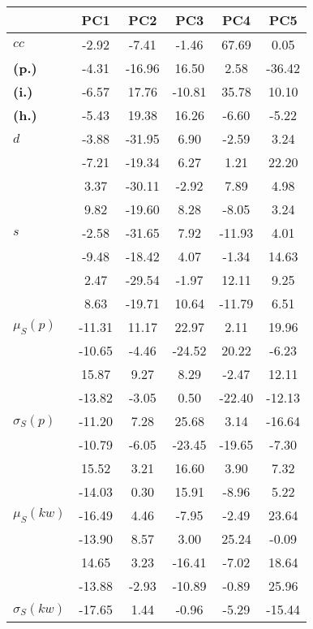 \begin{table}[h!]
\begin{center}
\begin{tabular}{| l || c | c | c | c | c |}\hline
 & {\bf PC1} & {\bf PC2} & {\bf PC3} & {\bf PC4} & {\bf PC5} \\\hline\hline
{\bf $cc$} & -2.92 & -7.41 & -1.46 & 67.69 & 0.05 \\
{\bf (p.)} & -4.31 & -16.96 & 16.50 & 2.58 & -36.42 \\
{\bf (i.)} & -6.57 & 17.76 & -10.81 & 35.78 & 10.10 \\
{\bf (h.)} & -5.43 & 19.38 & 16.26 & -6.60 & -5.22 \\\hline
{\bf $d$} & -3.88 & -31.95 & 6.90 & -2.59 & 3.24 \\
{\bf } & -7.21 & -19.34 & 6.27 & 1.21 & 22.20 \\
{\bf } & 3.37 & -30.11 & -2.92 & 7.89 & 4.98 \\
{\bf } & 9.82 & -19.60 & 8.28 & -8.05 & 3.24 \\\hline
{\bf $s$} & -2.58 & -31.65 & 7.92 & -11.93 & 4.01 \\
{\bf } & -9.48 & -18.42 & 4.07 & -1.34 & 14.63 \\
 & 2.47  & -29.54  & -1.97  & 12.11  & 9.25 \\
 & 8.63  & -19.71  & 10.64  & -11.79  & 6.51 \\\hline
$\mu_S(p)$ & -11.31  & 11.17  & 22.97  & 2.11  & 19.96 \\
 & -10.65  & -4.46  & -24.52  & 20.22  & -6.23 \\
 & 15.87  & 9.27  & 8.29  & -2.47  & 12.11 \\
 & -13.82  & -3.05  & 0.50  & -22.40  & -12.13 \\\hline
$\sigma_S(p)$ & -11.20  & 7.28  & 25.68  & 3.14  & -16.64 \\
 & -10.79  & -6.05  & -23.45  & -19.65  & -7.30 \\
 & 15.52  & 3.21  & 16.60  & 3.90  & 7.32 \\
 & -14.03  & 0.30  & 15.91  & -8.96  & 5.22 \\\hline
$\mu_S(kw)$ & -16.49  & 4.46  & -7.95  & -2.49  & 23.64 \\
 & -13.90  & 8.57  & 3.00  & 25.24  & -0.09 \\
 & 14.65  & 3.23  & -16.41  & -7.02  & 18.64 \\
 & -13.88  & -2.93  & -10.89  & -0.89  & 25.96 \\\hline
$\sigma_S(kw)$ & -17.65  & 1.44  & -0.96  & -5.29  & -15.44 \\

\end{tabular}
\end{center}
\end{table}

